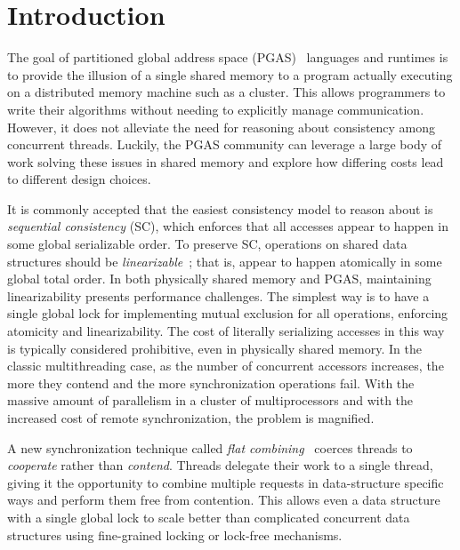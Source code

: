 \section{Introduction}
The goal of partitioned global address space (PGAS)~\cite{upc:2005} languages and runtimes is to provide the illusion of a single shared memory to a program actually executing on a distributed memory machine such as a cluster. This allows programmers to write their algorithms without needing to explicitly manage communication.
However, it does not alleviate the need for reasoning about consistency among concurrent threads.
Luckily, the PGAS community can leverage a large body of work solving these issues in shared memory and explore how differing costs lead to different design choices.

It is commonly accepted that the easiest consistency model to reason about is \emph{sequential consistency} (SC), which enforces that all accesses appear to happen in some global serializable order.
To preserve SC, operations on shared data structures should be \emph{linearizable}~\cite{herlihy1990linearizability}; that is, appear to happen atomically in some global total order.
In both physically shared memory and PGAS, maintaining linearizability presents performance challenges.
The simplest way is to have a single global lock for implementing mutual exclusion for all operations, enforcing atomicity and linearizability. The cost of literally serializing accesses in this way is typically considered prohibitive, even in physically shared memory.
In the classic multithreading case, as the number of concurrent accessors increases, the more they contend and the more synchronization operations fail.
With the massive amount of parallelism in a cluster of multiprocessors and with the increased cost of remote synchronization, the problem is magnified.

A new synchronization technique called \emph{flat combining}~\cite{flatCombining} coerces threads to \emph{cooperate} rather than \emph{contend}.
Threads delegate their work to a single thread, giving it the opportunity to combine multiple requests in data-structure specific ways and perform them free from contention.
This allows even a data structure with a single global lock to scale better than complicated concurrent data structures using fine-grained locking or lock-free mechanisms.

